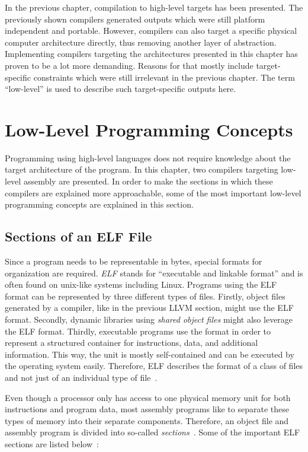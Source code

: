 In the previous chapter, compilation to high-level targets has been presented.
The previously shown compilers generated outputs which were still platform independent and portable.
However, compilers can also target a specific physical computer architecture directly, thus removing another layer of abstraction.
Implementing compilers targeting the architectures presented in this chapter has proven to be a lot more demanding.
Reasons for that mostly include target-specific constraints which were
still irrelevant in the previous chapter.
The term \enquote{low-level} is used to describe such target-specific outputs here.

\section{Low-Level Programming Concepts}
Programming using high-level languages does not require knowledge about the target architecture of the program.
In this chapter, two compilers targeting low-level assembly are presented.
In order to make the sections in which these compilers are explained more approachable,
some of the most important low-level programming concepts are explained in this section.

\subsection{Sections of an ELF File}
Since a program needs to be representable in bytes, special formats for organization are required.
\emph{ELF} stands for \enquote{executable and linkable format} and is often found on unix-like systems including Linux.
Programs using the ELF format can be represented by three different types of files.
Firstly, object files generated by a compiler, like in the previous LLVM section, might use the ELF format.
Secondly, dynamic libraries using \emph{shared object files} might also leverage the ELF format.
Thirdly, executable programs use the format in order to represent a structured container for instructions, data, and additional information.
This way, the unit is mostly self-contained and can be executed by the operating system easily.
Therefore, ELF describes the format of a class of files and not just of an individual type of file~\cite[pp.~74--76]{Zhirkov2017-wk}.

Even though a processor only has access to one physical memory unit for both instructions and program data,
most assembly programs like to separate these types of memory into their separate components.
Therefore, an object file and assembly program is divided into so-called \emph{sections}~\cite[p.~19]{Zhirkov2017-wk}.
Some of the important ELF sections are listed below~\cite[p.~76]{Zhirkov2017-wk}:

